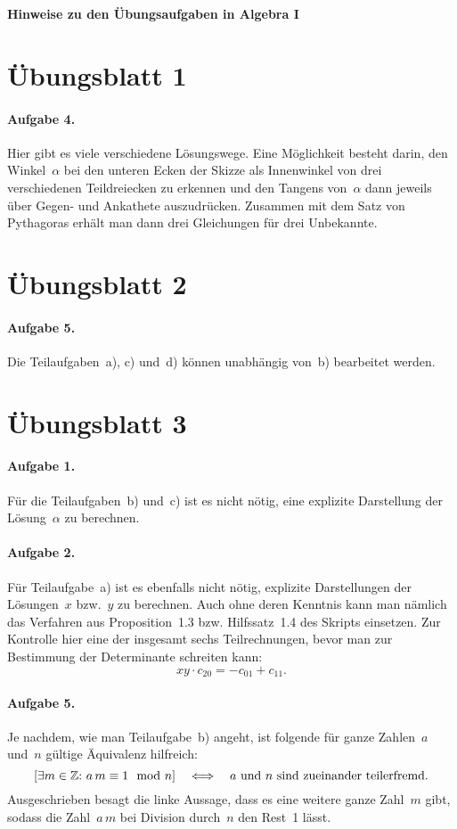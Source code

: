 \documentclass{../algblatt}
\begin{document}
\begin{center}\Large \textsf{\textbf{Hinweise zu den Übungsaufgaben in Algebra I}}\end{center}
\vspace{1em}


\section*{Übungsblatt 1}

\paragraph{Aufgabe 4.} Hier gibt es viele verschiedene Lösungswege. Eine
Möglichkeit besteht darin, den Winkel~$\alpha$ bei den unteren Ecken der Skizze
als Innenwinkel von drei verschiedenen Teildreiecken zu erkennen und den
Tangens von~$\alpha$ dann jeweils über Gegen- und Ankathete auszudrücken.
Zusammen mit dem Satz von Pythagoras erhält man dann drei Gleichungen für drei
Unbekannte.


\section*{Übungsblatt 2}

\paragraph{Aufgabe 5.} Die Teilaufgaben~a), c) und~d) können unabhängig von~b)
bearbeitet werden.


\section*{Übungsblatt 3}

\paragraph{Aufgabe 1.} Für die Teilaufgaben~b) und~c) ist es nicht nötig, eine
explizite Darstellung der Lösung~$\alpha$ zu berechnen.

\paragraph{Aufgabe 2.} Für Teilaufgabe~a) ist es ebenfalls nicht nötig,
explizite Darstellungen der Lösungen~$x$ bzw.~$y$ zu berechnen. Auch ohne deren
Kenntnis kann man nämlich das Verfahren aus Proposition~1.3 bzw. Hilfssatz~1.4 des
Skripts einsetzen. Zur Kontrolle hier eine der insgesamt sechs Teilrechnungen,
bevor man zur Bestimmung der Determinante schreiten kann:
\[ xy \cdot c_{20} = -c_{01} + c_{11}. \]

\paragraph{Aufgabe 5.} Je nachdem, wie man Teilaufgabe~b) angeht, ist folgende
für ganze Zahlen~$a$ und~$n$ gültige Äquivalenz hilfreich:
\[ \left[\exists m \in \mathbb{Z}{:}\ a\,m \equiv 1 \mod{n}\right]
  \quad\Longleftrightarrow\quad
  \text{$a$ und~$n$ sind zueinander teilerfremd.} \]
Ausgeschrieben besagt die linke Aussage, dass es eine weitere ganze Zahl~$m$
gibt, sodass die Zahl~$a\,m$ bei Division durch~$n$ den Rest~1 lässt.
\end{document}
